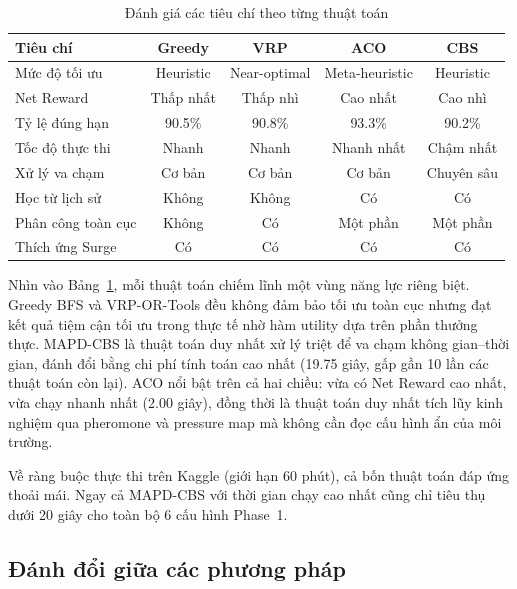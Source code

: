\documentclass[conference]{IEEEtran}
\begin{document}
\begin{table}[htbp]
\caption{Đánh giá các tiêu chí theo từng thuật toán}
\label{tab:criteria}
\centering
\footnotesize
\begin{tabular}{|l|c|c|c|c|}
\hline
\textbf{Tiêu chí}          & \textbf{Greedy} & \textbf{VRP} & \textbf{ACO} & \textbf{CBS} \\
\hline
Mức độ tối ưu       & Heuristic     & Near-optimal   & Meta-heuristic & Heuristic  \\
Net Reward          & Thấp nhất     & Thấp nhì       & Cao nhất       & Cao nhì    \\
Tỷ lệ đúng hạn      & 90.5\%        & 90.8\%         & 93.3\%         & 90.2\%     \\
Tốc độ thực thi     & Nhanh         & Nhanh          & Nhanh nhất     & Chậm nhất  \\
Xử lý va chạm       & Cơ bản        & Cơ bản         & Cơ bản         & Chuyên sâu \\
Học từ lịch sử      & Không         & Không          & Có             & Có      \\
Phân công toàn cục  & Không         & Có             & Một phần       & Một phần   \\
Thích ứng Surge     & Có            & Có             & Có             & Có         \\
\hline
\end{tabular}
\end{table}

Nhìn vào Bảng~\ref{tab:criteria}, mỗi thuật toán chiếm lĩnh một vùng năng lực riêng biệt. Greedy BFS và VRP-OR-Tools đều không đảm bảo tối ưu toàn cục nhưng đạt kết quả tiệm cận tối ưu trong thực tế nhờ hàm utility dựa trên phần thưởng thực. MAPD-CBS là thuật toán duy nhất xử lý triệt để va chạm không gian--thời gian, đánh đổi bằng chi phí tính toán cao nhất (19.75 giây, gấp gần 10 lần các thuật toán còn lại). ACO nổi bật trên cả hai chiều: vừa có Net Reward cao nhất, vừa chạy nhanh nhất (2.00 giây), đồng thời là thuật toán duy nhất tích lũy kinh nghiệm qua pheromone và pressure map mà không cần đọc cấu hình ẩn của môi trường.

Về ràng buộc thực thi trên Kaggle (giới hạn 60 phút), cả bốn thuật toán đáp ứng thoải mái. Ngay cả MAPD-CBS với thời gian chạy cao nhất cũng chỉ tiêu thụ dưới 20 giây cho toàn bộ 6 cấu hình Phase~1.

\subsection{Đánh đổi giữa các phương pháp}
\end{document}
